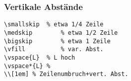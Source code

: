 \negAbstand
%
\subsubsection*{Vertikale Abstände}
\vspace{-0.7\baselineskip}
\begin{lstlisting}		
\smallskip	% etwa 1/4 Zeile
\medskip		% etwa 1/2 Zeile
\bigskip		% etwa 1 Zeile
\vfill			% var. Abst.
\vspace{L}	% L hoch
\vspace*{L}	% 
\\[1em]	% Zeilenumbruch+vert. Abst.
\end{lstlisting}
